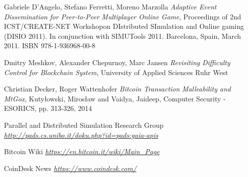 \begin{thebibliography}{99}
 Gabriele D'Angelo, Stefano Ferretti, Moreno Marzolla
{\em Adaptive Event Dissemination for Peer-to-Peer Multiplayer Online Game},
Proceedings of 2nd ICST/CREATE-NET Workshopon DIstributed SImulation and Online gaming (DISIO 2011).
In conjunction with SIMUTools 2011. Barcelona, Spain, March 2011. ISBN 978-1-936968-00-8

 Dmitry Meshkov, Alexander Chepurnoy, Marc Jansen
{\em Revisiting Difficulty Control for Blockchain System},
University of Applied Sciences Ruhr West

 Christian Decker, Roger Wattenhofer
{\em Bitcoin Transaction Malleability and MtGox},
Kuty{\l}owski, Miros{\l}aw and Vaidya, Jaideep, Computer Security - ESORICS, pp. 313-326, 2014

 Parallel and Distributed Simulation Research Group
{\em \url{http://pads.cs.unibo.it/doku.php?id=pads:gaia-apis}}

 Bitcoin Wiki
{\em \url{https://en.bitcoin.it/wiki/Main_Page}}

 CoinDesk News
{\em \url{https://www.coindesk.com/}}

\end{thebibliography}
